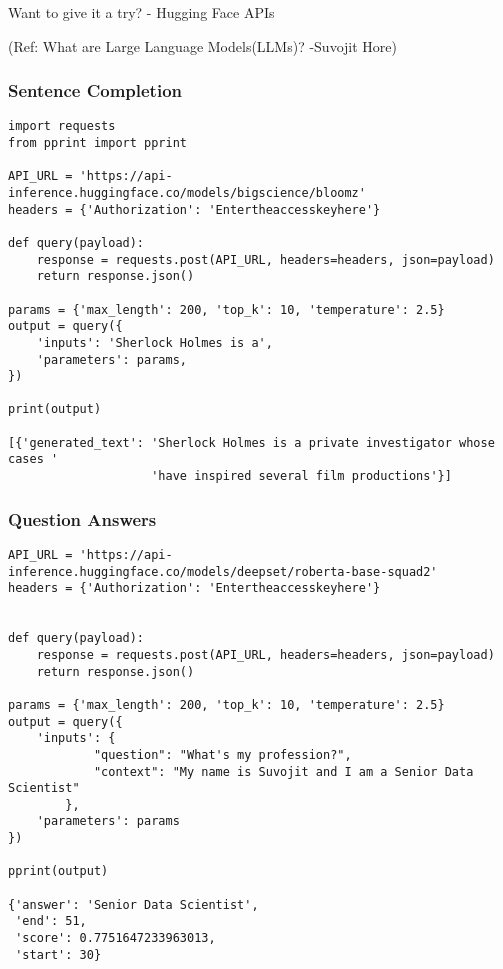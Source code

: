 \begin{frame}[fragile]\frametitle{}
\begin{center}
{\Large Want to give it a try? - Hugging Face APIs}

  {\tiny (Ref: What are Large Language Models(LLMs)? -Suvojit Hore)}

\end{center}
\end{frame}

\begin{frame}[fragile]\frametitle{Sentence Completion}


\begin{lstlisting}
import requests
from pprint import pprint

API_URL = 'https://api-inference.huggingface.co/models/bigscience/bloomz'
headers = {'Authorization': 'Entertheaccesskeyhere'}

def query(payload):
    response = requests.post(API_URL, headers=headers, json=payload)
    return response.json()
  
params = {'max_length': 200, 'top_k': 10, 'temperature': 2.5}
output = query({
    'inputs': 'Sherlock Holmes is a',
    'parameters': params,
})

print(output)

[{'generated_text': 'Sherlock Holmes is a private investigator whose cases '
                    'have inspired several film productions'}]
\end{lstlisting}

\end{frame}


\begin{frame}[fragile]\frametitle{Question Answers}


\begin{lstlisting}
API_URL = 'https://api-inference.huggingface.co/models/deepset/roberta-base-squad2'
headers = {'Authorization': 'Entertheaccesskeyhere'}


def query(payload):
    response = requests.post(API_URL, headers=headers, json=payload)
    return response.json()
  
params = {'max_length': 200, 'top_k': 10, 'temperature': 2.5}
output = query({
    'inputs': {
            "question": "What's my profession?",
            "context": "My name is Suvojit and I am a Senior Data Scientist"
        },
    'parameters': params
})

pprint(output)

{'answer': 'Senior Data Scientist',
 'end': 51,
 'score': 0.7751647233963013,
 'start': 30}
\end{lstlisting}


\end{frame}


